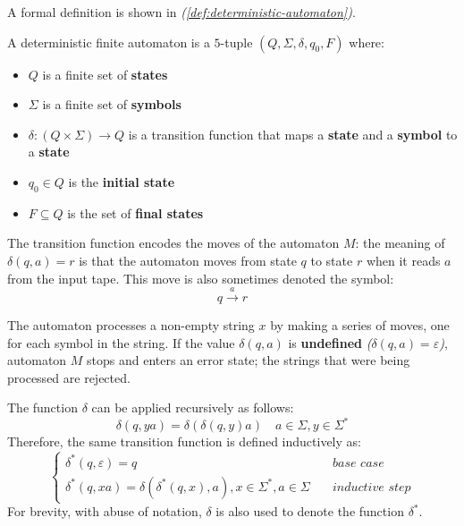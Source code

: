 \documentclass[english]{article}
\begin{document}
A formal definition is shown in \textit{(\ref{def:deterministic-automaton})}.

\begin{definition}
  \label{def:deterministic-automaton}

  A deterministic finite automaton is a \(5\)-tuple \((Q, \Sigma, \delta, q_0, F)\) where:

  \begin{itemize}
    \item \(Q\) is a finite set of \textbf{states}
    \item \(\Sigma\) is a finite set of \textbf{symbols}
    \item \(\delta: \left( Q \times \Sigma \right) \rightarrow Q\) is a transition function that maps a \textbf{state} and a \textbf{symbol} to a \textbf{state}
    \item \(q_0 \in Q\) is the\textbf{ initial state}
    \item \(F \subseteq Q\) is the set of \textbf{final states}
  \end{itemize}
\end{definition}

The transition function encodes the moves of the automaton \(M\): the meaning of \(\delta(q, a) = r\) is that the automaton moves from state \(q\) to state \(r\) when it reads \(a\) from the input tape.
This move is also sometimes denoted the symbol: \[q \xrightarrow{a} r\]

The automaton processes a non-empty string \(x\) by making a series of moves, one for each symbol in the string.
If the value \(\delta(q, a)\) is \textbf{undefined} \textit{(\(\delta(q, a) = \varepsilon\))}, automaton \(M\) stops and enters an error state;
the strings that were being processed are rejected.

The function \(\delta\) can be applied recursively as follows:
\[ \delta(q, ya) = \delta \left(  \delta \left( q, y \right) a \right) \quad a \in \Sigma, y \in \Sigma^\ast \]
Therefore, the same transition function is defined inductively as:
\[\begin{cases}
    \delta^\ast\left( q, \varepsilon \right) = q \quad                                                                   & \textit{base case}      \\
    \delta^\ast\left( q, xa \right) = \delta \left( \delta^\ast (q, x), a \right), x \in \Sigma^\ast, a \in \Sigma \quad & \textit{inductive step}
  \end{cases}\]
For brevity, with abuse of notation, \(\delta\) is also used to denote the function \(\delta^\ast\).
\end{document}
